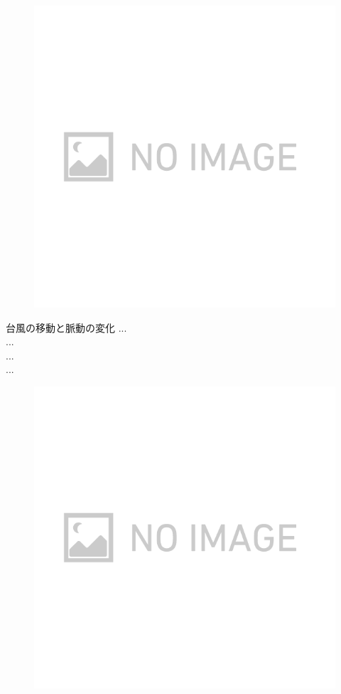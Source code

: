 \begin{figure}[h]
  \begin{center}   
    \includegraphics[width=16.0cm]{./img_chap3/img321.png}
    \caption{}\label{img:img321}
  \end{center}
\end{figure}

台風の移動と脈動の変化
...\\
...\\
...\\
...\\

\begin{figure}[h]
  \begin{center}   
    \includegraphics[width=16.0cm]{./img_chap3/img322.png}
    \caption{}\label{img:img322}
  \end{center}
\end{figure}


